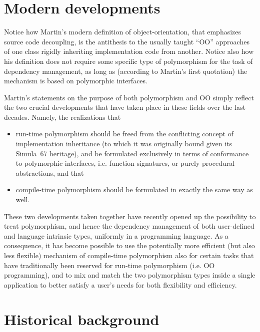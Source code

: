 \documentclass[11pt,oneside]{report}
\begin{document}
\section{Modern developments}

Notice how Martin's modern definition of object-orientation, that
emphasizes source code decoupling, is the antithesis to the usually
taught ``OO'' approaches of one class rigidly inheriting
implementation code from another. Notice also how his definition does
not require some specific type of polymorphism for the task of
dependency management, as long as (according to Martin's first
quotation) the mechanism is based on polymorphic interfaces.

Martin's statements on the purpose of both polymorphism and OO simply
reflect the two crucial developments that have taken place in these
fields over the last decades. Namely, the realizations that
\begin{itemize}
\item
  run-time polymorphism should be freed from the conflicting concept
  of implementation inheritance (to which it was originally bound
  given its Simula~67 heritage), and be formulated exclusively in
  terms of conformance to polymorphic interfaces, i.e. function
  signatures, or purely procedural abstractions, and that
\item
  compile-time polymorphism should be formulated in exactly the same
  way as well.
\end{itemize}

These two developments taken together have recently opened up the
possibility to treat polymorphism, and hence the dependency management
of both user-defined and language intrinsic types, uniformly in a
programming language. As a consequence, it has become possible to use
the potentially more efficient (but also less flexible) mechanism of
compile-time polymorphism also for certain tasks that have traditionally
been reserved for run-time polymorphism (i.e. OO programming), and to
mix and match the two polymorphism types inside a single application
to better satisfy a user's needs for both flexibility and efficiency.

\section{Historical background}
\end{document}
